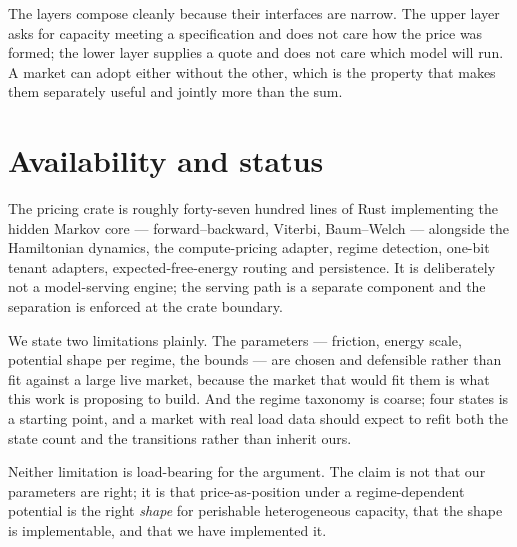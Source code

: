 \documentclass[11pt,a4paper]{article}
\begin{document}
The layers compose cleanly because their interfaces are narrow. The upper layer
asks for capacity meeting a specification and does not care how the price was
formed; the lower layer supplies a quote and does not care which model will run.
A market can adopt either without the other, which is the property that makes
them separately useful and jointly more than the sum.

\section{Availability and status}

The pricing crate is roughly forty-seven hundred lines of Rust implementing the
hidden Markov core --- forward--backward, Viterbi, Baum--Welch --- alongside the
Hamiltonian dynamics, the compute-pricing adapter, regime detection, one-bit
tenant adapters, expected-free-energy routing and persistence. It is deliberately
not a model-serving engine; the serving path is a separate component and the
separation is enforced at the crate boundary.

We state two limitations plainly. The parameters --- friction, energy scale,
potential shape per regime, the bounds --- are chosen and defensible rather than
fit against a large live market, because the market that would fit them is what
this work is proposing to build. And the regime taxonomy is coarse; four states
is a starting point, and a market with real load data should expect to refit both
the state count and the transitions rather than inherit ours.

Neither limitation is load-bearing for the argument. The claim is not that our
parameters are right; it is that price-as-position under a regime-dependent
potential is the right \emph{shape} for perishable heterogeneous capacity, that
the shape is implementable, and that we have implemented it.
\end{document}
